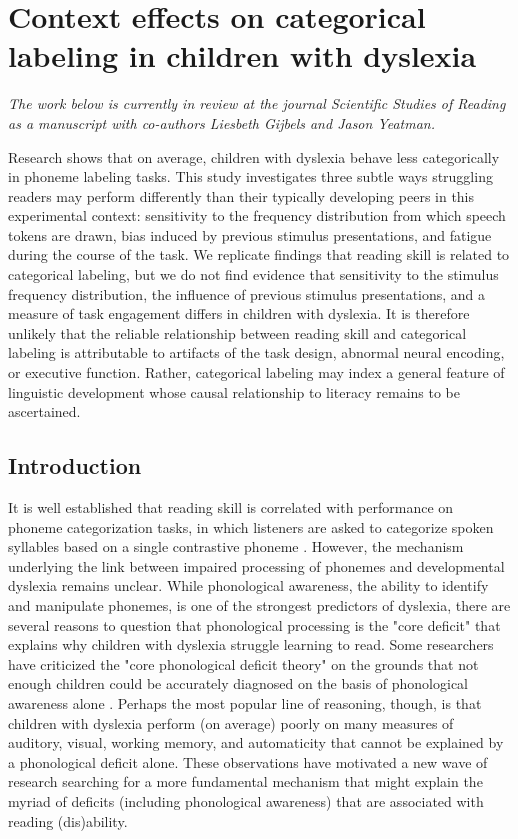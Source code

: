 \documentclass[../uwthesis.tex]{subfiles}
\begin{document}
\chapter{Context effects on categorical labeling in children with dyslexia}
\emph{The work below is currently in review at the journal Scientific Studies of Reading as a manuscript with co-authors Liesbeth Gijbels and Jason Yeatman.}

Research shows that on average, children with dyslexia behave less categorically in phoneme labeling tasks. This study investigates three subtle ways struggling readers may perform differently than their typically developing peers in this experimental context: sensitivity to the frequency distribution from which speech tokens are drawn, bias induced by previous stimulus presentations, and fatigue during the course of the task. We replicate findings that reading skill is related to categorical labeling, but we do not find evidence that sensitivity to the stimulus frequency distribution, the influence of previous stimulus presentations, and a measure of task engagement differs in children with dyslexia. It is therefore unlikely that the reliable relationship between reading skill and categorical labeling is attributable to artifacts of the task design, abnormal neural encoding, or executive function. Rather, categorical labeling may index a general feature of linguistic development whose causal relationship to literacy remains to be ascertained. 

\section{Introduction}
It is well established that reading skill is correlated with performance on phoneme categorization tasks, in which listeners are asked to categorize spoken syllables based on a single contrastive phoneme \citep{Noordenbos2015,Vandermosten2010,OBrien2018,OBrien2019CategoricalDuration,Goswami2002}. However, the mechanism underlying the link between impaired processing of phonemes and developmental dyslexia remains unclear. While phonological awareness, the ability to identify and manipulate phonemes, is one of the strongest predictors of dyslexia, there are several reasons to question that phonological processing is the "core deficit" that explains why children with dyslexia struggle learning to read. Some researchers have criticized the "core phonological deficit theory" on the grounds that not enough children could be accurately diagnosed on the basis of phonological awareness alone \citep{Wolf2000Naming-speedHypothesis,Pennington2012IndividualModels.}. Perhaps the most popular line of reasoning, though, is that children with dyslexia perform (on average) poorly on many measures of auditory, visual, working memory, and automaticity that cannot be explained by a phonological deficit alone. These observations have motivated a new wave of research searching for a more fundamental mechanism that might explain the myriad of deficits (including phonological awareness) that are associated with reading (dis)ability.
\end{document}

